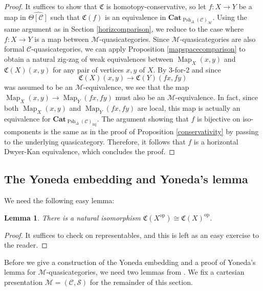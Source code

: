 \documentclass[leqno]{article}
\numberwithin{equation}{subsection}
\theoremstyle{plain}   %
\newtheorem{lemma}[equation]{Lemma}
\theoremstyle{remark}
\theoremstyle{plain}
\newcommand{\op}{\ensuremath{\mathrm{op}}}
\newcommand{\Cat}{\ensuremath{\mathbf{Cat}}}
\DeclareMathOperator{\Map}{Map}
\newcommand{\C}{\ensuremath{\mathcal{C}}}
\newcommand{\M}{\ensuremath{\mathcal{M}}}
\newcommand{\setS}{\ensuremath{\mathscr{S}}}
\newcommand{\cellset}{\ensuremath{\widehat{\Theta[\mathcal{C}]}}}
\newcommand{\spsh}{\ensuremath{\operatorname{Psh}_\Delta(\mathcal{C})}}
\begin{document}
\begin{proof} It suffices to show that \(\mathfrak{C}\) is homotopy-conservative, so let \(f:X\to Y\) be a map in \(\cellset\) such that \(\mathfrak{C}(f)\) is an equivalence in \(\Cat_{\spsh_{\M}}\). Using the same argument as in Section \ref{horizcomparison}, we reduce to the case where \(f:X\to Y\) is a map between \(\M\)-quasicategories.  Since \(\M\)-quasicategories are also formal \(\C\)-quasicategories, we can apply Proposition \ref{mapspacecomparison} to obtain a natural zig-zag of weak equivalences between \(\Map_X(x,y)\) and \(\mathfrak{C}(X)(x,y)\) for any pair of vertices \(x,y\) of \(X\).  By \(3\)-for-\(2\) and since \[\mathfrak{C}(X)(x,y) \to \mathfrak{C}(Y)(fx,fy)\] was assumed to be an \(\M\)-equivalence, we see that the map \(\Map_X(x,y)\to \Map_Y(fx,fy)\) must also be an \(\M\)-equivalence.  In fact, since both \(\Map_X(x,y)\) and \(\Map_Y(fx,fy)\) are local, this map is actually an equivalence for \(\Cat_{\spsh_{\mathrm{inj}}}\).  The argument showing that \(f\) is bijective on iso-components is the same as in the proof of Proposition \ref{conservativity} by passing to the underlying quasicategory.  Therefore, it follows that \(f\) is a horizontal Dwyer-Kan equivalence, which concludes the proof.
\end{proof}
\subsection{The Yoneda embedding and Yoneda's lemma}
We need the following easy lemma:
\begin{lemma} There is a natural isomorphism \(\mathfrak{C}(X^\op)\cong \mathfrak{C}(X)^\op\).  
\end{lemma} 
\begin{proof}
	It suffices to check on representables, and this is left as an easy exercise to the reader.
\end{proof}
Before we give a construction of the Yoneda embedding and a proof of Yoneda's lemma for \(\M\)-quasicategories, we need two lemmas from \cite{htt}.   We fix a cartesian presentation \(\mathcal{M}=(\C,\setS)\) for the remainder of this section.
\end{document}
